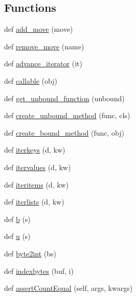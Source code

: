 \subsection*{Functions}
\begin{DoxyCompactItemize}
\item 
def \hyperlink{namespacepip_1_1__vendor_1_1six_a8c63d723c59556118f2eb7fe94b75d52}{add\+\_\+move} (move)
\item 
def \hyperlink{namespacepip_1_1__vendor_1_1six_a9a39a7fc7fa0233c25e2fc090f865b5b}{remove\+\_\+move} (name)
\item 
def \hyperlink{namespacepip_1_1__vendor_1_1six_a75742fb36a97b159d3fd902178af9988}{advance\+\_\+iterator} (it)
\item 
def \hyperlink{namespacepip_1_1__vendor_1_1six_a797024f0c238fce473a6869e60175a92}{callable} (obj)
\item 
def \hyperlink{namespacepip_1_1__vendor_1_1six_a26a9527e3db37501de957f999a989ddb}{get\+\_\+unbound\+\_\+function} (unbound)
\item 
def \hyperlink{namespacepip_1_1__vendor_1_1six_ae996fcb6a95bbf95f0a2944752e23bc4}{create\+\_\+unbound\+\_\+method} (func, cls)
\item 
def \hyperlink{namespacepip_1_1__vendor_1_1six_aaa257bc1a1234d38c2f0f0bce5d39932}{create\+\_\+bound\+\_\+method} (func, obj)
\item 
def \hyperlink{namespacepip_1_1__vendor_1_1six_a91557c47ae7b136cce1ebc46bb7ca1de}{iterkeys} (d, kw)
\item 
def \hyperlink{namespacepip_1_1__vendor_1_1six_aca28ec8861cd0b1628eed00602740d10}{itervalues} (d, kw)
\item 
def \hyperlink{namespacepip_1_1__vendor_1_1six_a55ef3593dedb6cf3938de6b59e63df30}{iteritems} (d, kw)
\item 
def \hyperlink{namespacepip_1_1__vendor_1_1six_ae930be9fbd1b6babc91bb80145a13dd9}{iterlists} (d, kw)
\item 
def \hyperlink{namespacepip_1_1__vendor_1_1six_a994a9a19db7ed3f265cd449309abf545}{b} (s)
\item 
def \hyperlink{namespacepip_1_1__vendor_1_1six_a9df889144ce243c30726ac415b37c8eb}{u} (s)
\item 
def \hyperlink{namespacepip_1_1__vendor_1_1six_ad877fba5154f3ba28c2ddc5f9961b6a8}{byte2int} (bs)
\item 
def \hyperlink{namespacepip_1_1__vendor_1_1six_a0586b4607201829e4e03cd961e4c071d}{indexbytes} (buf, i)
\item 
def \hyperlink{namespacepip_1_1__vendor_1_1six_a2738cdde981fc762ba9d27689f670d21}{assert\+Count\+Equal} (self, args, kwargs)

\end{DoxyCompactItemize}
